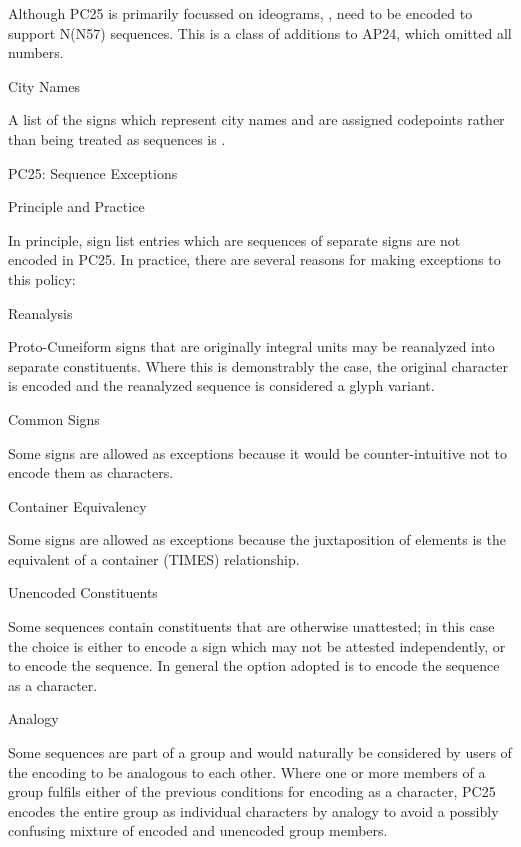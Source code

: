\par Although PC25 is primarily focussed on ideograms, , need to be
      encoded to support N(N57) sequences.  This is a class of
      additions to AP24, which omitted all numbers.

\Hhhh{}City Names


\par A list of the signs which represent city names and are
      assigned codepoints rather than being treated as sequences is
      .

\Hh{}PC25: Sequence Exceptions

\Hhh{}Principle and Practice


\par In principle, sign list entries which are sequences of
      separate signs are not encoded in PC25. In practice, there are
      several reasons for making exceptions to this policy:

\Hdl\Hdt{}Reanalysis

{}Proto-Cuneiform signs that are originally integral units
	may be reanalyzed into separate constituents. Where this is
	demonstrably the case, the original character is encoded and
	the reanalyzed sequence is considered a glyph variant.

\Hdt{}Common Signs

{}Some signs are allowed as exceptions because it would be
	counter-intuitive not to encode them as characters.

\Hdt{}Container Equivalency

{}Some signs are allowed as exceptions because the
	juxtaposition of elements is the equivalent of a container
	(TIMES) relationship.

\Hdt{}Unencoded Constituents

{}Some sequences contain constituents that are otherwise
	unattested; in this case the choice is either to encode a sign
	which may not be attested independently, or to encode the
	sequence.  In general the option adopted is to encode the
	sequence as a character.

\Hdt{}Analogy

{}Some sequences are part of a group and would naturally be
	considered by users of the encoding to be analogous to each
	other. Where one or more members of a group fulfils either of
	the previous conditions for encoding as a character, PC25
	encodes the entire group as individual characters by analogy
	to avoid a possibly confusing mixture of encoded and unencoded
	group members.

